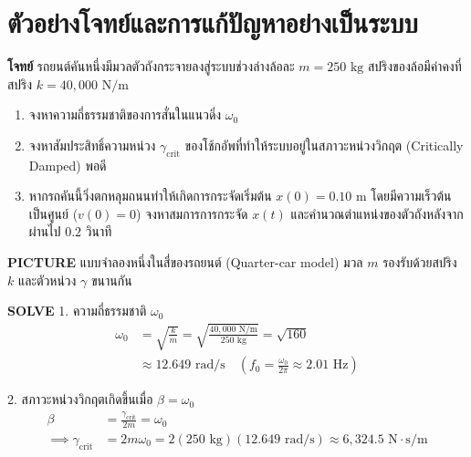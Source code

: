 \section{ตัวอย่างโจทย์และการแก้ปัญหาอย่างเป็นระบบ}

\begin{mathexample}
\textbf{โจทย์} รถยนต์คันหนึ่งมีมวลตัวถังกระจายลงสู่ระบบช่วงล่างล้อละ $m = 250\text{ kg}$ สปริงของล้อมีค่าคงที่สปริง $k = 40,000\text{ N/m}$
\begin{enumerate}
    \item จงหาความถี่ธรรมชาติของการสั่นในแนวดิ่ง $\omega_0$
    \item จงหาสัมประสิทธิ์ความหน่วง $\gamma_{\text{crit}}$ ของโช้กอัพที่ทำให้ระบบอยู่ในสภาวะหน่วงวิกฤต (Critically Damped) พอดี
    \item หากรถคันนี้วิ่งตกหลุมถนนทำให้เกิดการกระจัดเริ่มต้น $x(0) = 0.10\text{ m}$ โดยมีความเร็วต้นเป็นศูนย์ ($v(0) = 0$) จงหาสมการการกระจัด $x(t)$ และคำนวณตำแหน่งของตัวถังหลังจากผ่านไป $0.2\text{ วินาที}$
\end{enumerate}

\vspace{0.2cm}
\textbf{PICTURE} แบบจำลองหนึ่งในสี่ของรถยนต์ (Quarter-car model) มวล $m$ รองรับด้วยสปริง $k$ และตัวหน่วง $\gamma$ ขนานกัน

\vspace{0.2cm}
\textbf{SOLVE}
1. ความถี่ธรรมชาติ $\omega_0$
\begin{align}
\omega_0 &= \sqrt{\frac{k}{m}} = \sqrt{\frac{40,000\text{ N/m}}{250\text{ kg}}} = \sqrt{160} \nonumber\\
&\approx 12.649\text{ rad/s} \quad \left(f_0 = \frac{\omega_0}{2\pi} \approx 2.01\text{ Hz}\right)
\end{align}

2. สภาวะหน่วงวิกฤตเกิดขึ้นเมื่อ $\beta = \omega_0$
\begin{align}
\beta &= \frac{\gamma_{\text{crit}}}{2m} = \omega_0 \nonumber\\
\implies \gamma_{\text{crit}} &= 2m\omega_0 = 2(250\text{ kg})(12.649\text{ rad/s}) \approx 6,324.5\text{ N}\cdot\text{s/m}
\end{align}


\end{mathexample}
